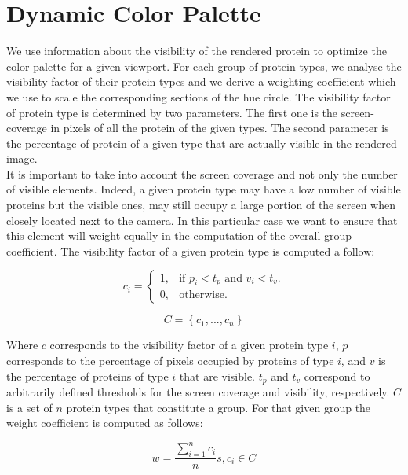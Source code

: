 \documentclass[review,journal]{vgtc}         %
\begin{document}
\section{Dynamic Color Palette}


We use information about the visibility of the rendered protein to optimize the color palette for a given viewport.
For each group of protein types, we analyse the visibility factor of their protein types and we derive a weighting coefficient which we use to scale the corresponding sections of the hue circle.
The visibility factor of protein type is determined by two parameters.
The first one is the screen-coverage in pixels of all the protein of the given types.
The second parameter is the percentage of protein of a given type that are actually visible in the rendered image. \\

It is important to take into account the screen coverage and not only the number of visible elements.
Indeed, a given protein type may have a low number of visible proteins but the visible ones, may still occupy a large portion of the screen when closely located next to the camera.
In this particular case we want to ensure that this element will weight equally in the computation of the overall group coefficient.
The visibility factor of a given protein type is computed a follow:

\begin{equation}
c_{i}=\begin{cases}
1, & \text{if $p_{i}<t_{p}$ and $v_{i}<t_{v}$}.\\
0, & \text{otherwise}.
\end{cases}
\end{equation}

\begin{equation}
C = \left\lbrace c_{1}, ... , c_{n} \right\rbrace 
\end{equation}

Where $c$ corresponds to the visibility factor of a given protein type $i$, $p$ corresponds to the percentage of pixels occupied by proteins of type $i$, and $v$ is the percentage of proteins of type $i$ that are visible.
$t_{p}$ and $t_{v}$ correspond to arbitrarily defined thresholds for the screen coverage and visibility, respectively. 
$C$ is a set of $n$ protein types that constitute a group.
For that given group the weight coefficient is computed as follows:

\begin{equation}
w = \frac{\sum_{i=1}^{n} c_{i}}{n} s, c_{i} \in C
\end{equation}
\end{document}
